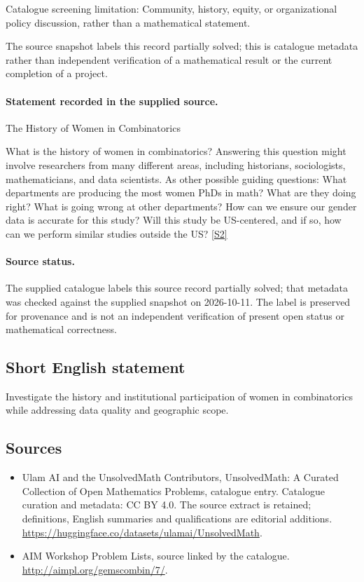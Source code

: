 \documentclass[11pt]{article}
\begin{document}
Catalogue screening limitation: Community, history, equity, or organizational policy discussion, rather than a mathematical statement.

The source snapshot labels this record partially solved; this is catalogue metadata rather than independent verification of a mathematical result or the current completion of a project.
\paragraph{Statement recorded in the supplied source.}
The History of Women in Combinatorics

What is the history of women in combinatorics? Answering this question might involve researchers from many different areas, including historians, sociologists, mathematicians, and data scientists. As other possible guiding questions: What departments are producing the most women PhDs in math? What are they doing right? What is going wrong at other departments? How can we ensure our gender data is accurate for this study? Will this study be US-centered, and if so, how can we perform similar studies outside the US? \href{http://aimpl.org/gemscombin/7/}{[S2]}
\paragraph{Source status.}
The supplied catalogue labels this source record partially solved; that metadata was checked against the supplied snapshot on 2026-10-11. The label is preserved for provenance and is not an independent verification of present open status or mathematical correctness.
\subsection{Short English statement}
Investigate the history and institutional participation of women in combinatorics while addressing data quality and geographic scope.
\subsection{Sources}
\begin{itemize}
\item[S1] Ulam AI and the UnsolvedMath Contributors, UnsolvedMath: A Curated Collection of Open Mathematics Problems, catalogue entry. Catalogue curation and metadata: CC BY 4.0. The source extract is retained; definitions, English summaries and qualifications are editorial additions.
\url{https://huggingface.co/datasets/ulamai/UnsolvedMath}.
\item[S2] AIM Workshop Problem Lists, source linked by the catalogue.
\url{http://aimpl.org/gemscombin/7/}.
\end{itemize}
\end{document}
